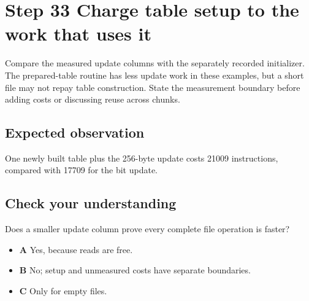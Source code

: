 \section{Step 33 Charge table setup to the work that uses it}\label{crc-s33}

Compare the measured update columns with the separately recorded initializer. The prepared-table routine has less update work in these examples, but a short file may not repay table construction. State the measurement boundary before adding costs or discussing reuse across chunks.

\subsection{Expected observation}
One newly built table plus the 256-byte update costs 21009 instructions, compared with 17709 for the bit update.

\subsection{Check your understanding}
Does a smaller update column prove every complete file operation is faster?

\begin{itemize}
\item \textbf{A} Yes, because reads are free.
\item \textbf{B} No; setup and unmeasured costs have separate boundaries.
\item \textbf{C} Only for empty files.
\end{itemize}
